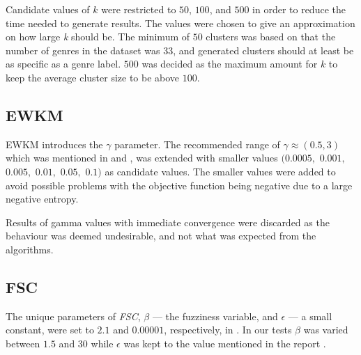 \documentclass[../report.tex]{subfiles}
\begin{document}
Candidate values of $k$ were restricted to $50$, $100$, and $500$ in order to reduce the time needed to generate results. The values were chosen to give an approximation on how large \textit{k} should be. The minimum of $50$ clusters was based on that the number of genres in the dataset was $33$, and generated clusters should at least be as specific as a genre label. $500$ was decided as the maximum amount for $k$ to keep the average cluster size to be above $100$.





\subsection{EWKM}
EWKM introduces the $\gamma$ parameter. The recommended range of $\gamma \approx (0.5, 3)$ which was mentioned in \citeauthor{Jing2007} \cite{Jing2007} and \citeauthor{wskm2014hz} \cite{wskm2014hz}, was extended with smaller values $(0.0005,$ $0.001,$ $0.005,$ $0.01,$ $0.05,$ $0.1)$ as candidate values. The smaller values were added to avoid possible problems with the objective function being negative due to a large negative entropy.

Results of gamma values with immediate convergence were discarded as the behaviour was deemed undesirable, and not what was expected from the algorithms.

\subsection{FSC}
The unique parameters of \textit{FSC}, $\beta$ --- the fuzziness variable, and $\epsilon$ --- a small constant, were set to $2.1$ and $0.00001$, respectively, in \cite{Gan2006}. In our tests $\beta$ was varied between $1.5$ and $30$ while $\epsilon$ was kept to the value mentioned in the report \citeauthor{Gan2006} \cite{Gan2006}.
\end{document}
